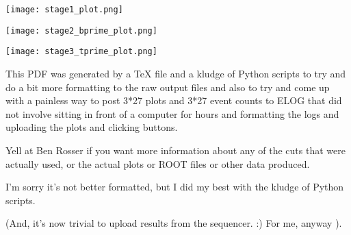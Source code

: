 \documentclass{article}
\begin{document}
{
	\small
	
}

\begin{center}
  \texttt{[image: stage1\_plot.png]}
\end{center}

\clearpage

{
	\small
	
}

\begin{center}
  \texttt{[image: stage2\_bprime\_plot.png]}
\end{center}

\clearpage

{
	\small
	
}

\begin{center}
  \texttt{[image: stage3\_tprime\_plot.png]}
\end{center}

\clearpage

This PDF was generated by a TeX file and a kludge of Python scripts to try and
do a bit more formatting to the raw output files and also to try and come up
with a painless way to post 3*27 plots and 3*27 event counts to ELOG that did
not involve sitting in front of a computer for hours and formatting the logs
and uploading the plots and clicking buttons.

Yell at Ben Rosser if you want more information about any of the cuts that were
actually used, or the actual plots or ROOT files or other data produced.

I'm sorry it's not better formatted, but I did my best with the kludge of Python
scripts.

(And, it's now trivial to upload results from the sequencer. :) For me, anyway ).
\end{document}
